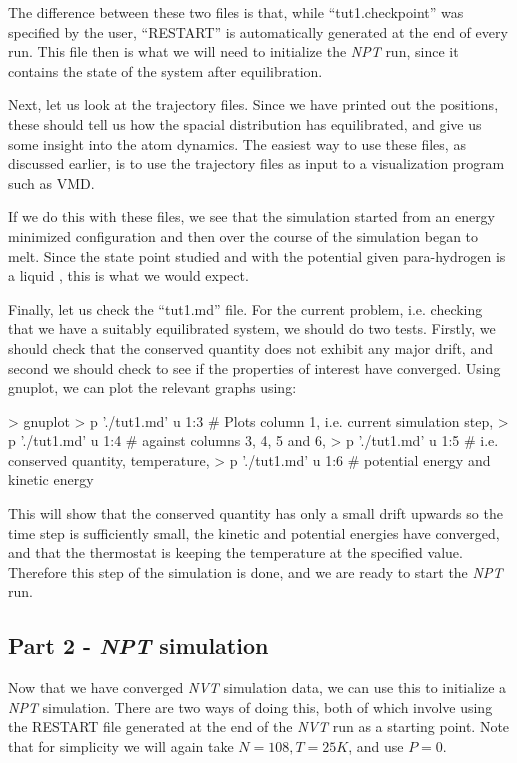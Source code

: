 \documentclass[11pt,english,fleqn]{report}
\newenvironment{code}{%
\footnotesize 
\verbatim
}{
\endverbatim
\normalsize
}
\begin{document}
The difference between these two files is that, while {}``tut1.checkpoint''
was specified by the user, {}``RESTART'' is automatically generated at the
end of every \ipi run. This file then is what we will need to initialize the
\emph{NPT} run, since it contains the state of the system after
equilibration.

Next, let us look at the trajectory files. Since we have printed out
the positions, these should tell us how the spacial distribution
has equilibrated, and give us some insight into the atom dynamics.
The easiest way to use these files, as discussed earlier, is to
use the trajectory files as input to a visualization program such as VMD.

If we do this with these files, we see that the simulation started
from an energy minimized configuration and then over the course
of the simulation began to melt. Since the state point studied
and with the potential given para-hydrogen is a liquid \cite{silv-gold78jcp},
this is what we would expect.

Finally, let us check the {}``tut1.md'' file. For the current
problem, i.e. checking that we have a suitably equilibrated system,
we should do two tests. Firstly,
we should check that the conserved quantity does not exhibit any major
drift, and second we should check to see if the properties of interest
have converged. Using gnuplot, we can plot the relevant graphs using:

\begin{code}
> gnuplot
> p './tut1.md' u 1:3 # Plots column 1, i.e. current simulation step, 
> p './tut1.md' u 1:4 # against columns 3, 4, 5 and 6,
> p './tut1.md' u 1:5 # i.e. conserved quantity, temperature,
> p './tut1.md' u 1:6 # potential energy and kinetic energy
\end{code}

This will show that the conserved quantity has only a small drift upwards
so the time step is sufficiently small, the
kinetic and potential energies have converged, and that the thermostat
is keeping the temperature at the specified value.
Therefore this step of the simulation is done, and we are ready
to start the \emph{NPT} run.

\subsection{Part 2 - \emph{NPT} simulation}

Now that we have converged \emph{NVT} simulation data, we can use this to
initialize a \emph{NPT} simulation. 
There are two ways of doing this,
both of which involve using the RESTART file generated at
the end of the \emph{NVT} run as a starting point.
Note that for simplicity we will again take \(N=108, T=25 K\), and use
\(P=0\).
\end{document}
